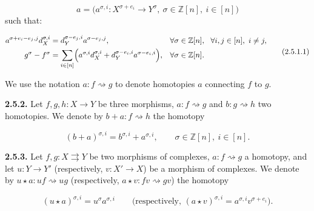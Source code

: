 \begin{equation*}
  a=\bigl(a^{\sigma,i}\colon X^{\sigma+e_i}\longrightarrow Y^\sigma,
    \ \sigma\in\mathbb Z[n],\ i\in[n]\bigr)
\end{equation*}
such that:

\begin{equation}
  \begin{aligned}
    a^{\sigma+e_i-e_j,j}d_X^{\sigma,i}
      &=d_Y^{\sigma-e_j,i}a^{\sigma-e_j,j},
      &&\forall\sigma\in\mathbb Z[n],\
        \ \forall i,j\in[n],\ i\ne j,\\
    g^\sigma-f^\sigma
      &=\sum_{i\in[n]}\Bigl(
          a^{\sigma,i}d_X^{\sigma,i}
          +d_Y^{\sigma-e_i,i}a^{\sigma-e_i,i}\Bigr),
      &&\forall\sigma\in\mathbb Z[n].
  \end{aligned}
  \tag{2.5.1.1}
\end{equation}

We use the notation $a\colon f\rightsquigarrow g$ to denote homotopies $a$
connecting $f$ to $g$.

\noindent\textbf{2.5.2.}\quad
Let $f,g,h\colon X\longrightarrow Y$ be three morphisms,
$a\colon f\rightsquigarrow g$ and $b\colon g\rightsquigarrow h$ two
homotopies. We denote by $b+a\colon f\rightsquigarrow h$ the homotopy

\begin{equation*}
  (b+a)^{\sigma,i}=b^{\sigma,i}+a^{\sigma,i},
  \qquad \sigma\in\mathbb Z[n],\ i\in[n].
\end{equation*}

\noindent\textbf{2.5.3.}\quad
Let $f,g\colon X\rightrightarrows Y$ be two morphisms of complexes,
$a\colon f\rightsquigarrow g$ a homotopy, and let
$u\colon Y\longrightarrow Y'$ (respectively, $v\colon X'\longrightarrow X$)
be a morphism of complexes. We denote by
$u\star a\colon uf\rightsquigarrow ug$ (respectively,
$a\star v\colon fv\rightsquigarrow gv$) the homotopy

\begin{equation*}
  (u\star a)^{\sigma,i}=u^\sigma a^{\sigma,i}
  \qquad
  \text{(respectively, }(a\star v)^{\sigma,i}
    =a^{\sigma,i}v^{\sigma+e_i}\text{)}.
\end{equation*}
